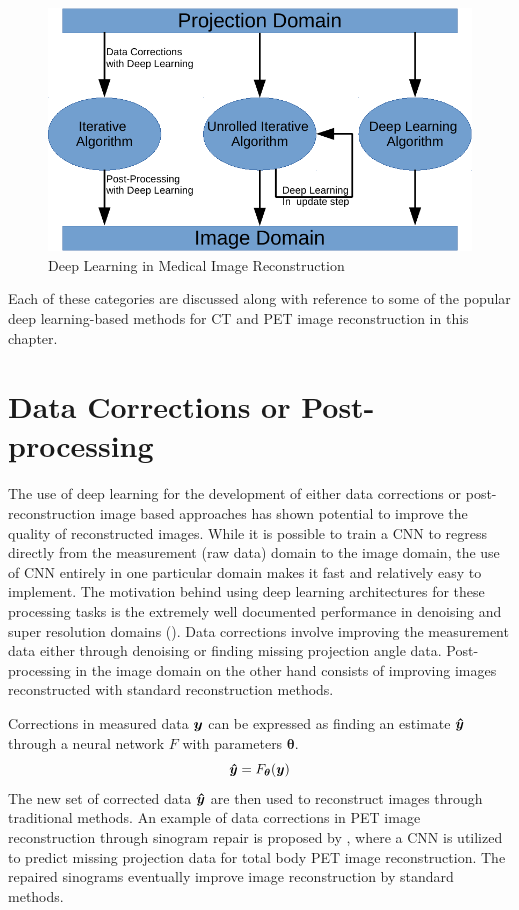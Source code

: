 \begin{figure}[!htbp]
	\centering
	\includegraphics[width=0.8\linewidth]{./Figures/dl_mi.pdf}
	\caption{Deep Learning in Medical Image Reconstruction}
	\label{fig:dl}
\end{figure}


Each of these categories are discussed along with reference to some of the popular deep learning-based methods for \ac{CT} and \ac{PET} image reconstruction in this chapter. 

\section{Data Corrections or Post-processing}

The use of deep learning for the development of either data corrections or post-reconstruction  image based approaches has shown potential to improve the quality of reconstructed images. While it is possible to train a \ac{CNN} to regress directly from the measurement (raw data) domain to the image domain, the use of \ac{CNN} entirely in one particular domain makes it fast and relatively easy to implement. The motivation behind using deep learning architectures for these processing tasks is the extremely well documented performance in denoising and super resolution domains (\cite{tian2020deep,wang2020deep}). Data corrections involve improving the measurement data either through denoising or finding missing projection angle data. Post-processing in the image domain on the other hand consists of improving images reconstructed with standard reconstruction methods. 

Corrections in measured data $\bm{y}$ can be expressed as finding an estimate $\bm{\hat{y}}$ through a neural network $F$ with parameters $\bm{\theta}$. 
\begin{equation}\label{eq:data_cor}
	\bm{\hat{y}} = F_{\bm{\theta}} (\bm{y})
\end{equation} 
The new set of corrected data $\bm{\hat{y}}$ are then used to reconstruct images through traditional methods. An example of data corrections in \ac{PET} image reconstruction through sinogram repair is proposed by \cite{whiteley2019cnn}, where a \ac{CNN} is utilized to predict missing projection data for total body \ac{PET} image reconstruction. The repaired sinograms eventually improve image reconstruction by standard methods.

